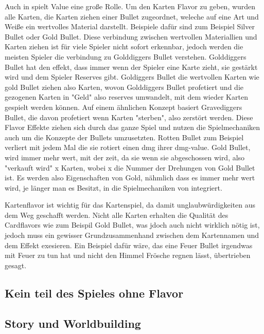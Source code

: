 Auch in \FF spielt Value eine große Rolle.
Um den Karten Flavor zu geben, wurden alle Karten, die Karten ziehen einer Bullet zugeordnet, weleche auf eine Art und Weiße ein wertvolles Material darstellt.
Beispiele dafür sind zum Beispiel Silver Bullet oder Gold Bullet. Diese verbindung zwischen wertvollen
Materiallien und Karten ziehen ist für viele Spieler nicht sofort erkennbar, jedoch werden die meisten Spieler die verbindung zu Golddiggers Bullet verstehen.
Golddiggers Bullet hat den effekt, dass immer wenn der Spieler eine Karte zieht, sie gestärkt wird und dem Spieler Reserves gibt.
Goldiggers Bullet die wertvollen Karten wie gold Bullet ziehen also Karten, wovon Golddiggers Bullet profetiert und die
gezogenen Karten in "Geld" also reserves umwandelt, mit dem wieder Karten gespielt werden können. Auf einem ähnlichen Konzept basiert Gravediggers Bullet, die davon profetiert wenn Karten "sterben", also zerstört werden.
Diese Flavor Effekte ziehen sich durch das ganze Spiel und nutzen die Spielmechaniken auch um die Konzepte der Bullets umzusetzten.
Rotten Bullet zum Beispiel verliert mit jedem Mal die sie rotiert einen dmg ihrer dmg-value. Gold Bullet, wird immer mehr
wert, mit der zeit, da sie wenn sie abgeschossen wird, also "verkauft wird" x Karten, wobei x die Nummer der Drehungen
von Gold Bullet ist. Es werden also Eigenschaften von Gold, nähmlich dass es immer mehr wert wird, je länger man es Besitzt,
in die Spielmechaniken von \FF integriert.


Kartenflavor ist wichtig für das Kartenspiel, da damit unglaubwürdigkeiten aus dem Weg geschafft werden.
Nicht alle Karten erhalten die Qualität des Cardflavors wie zum Beispil Gold Bullet, was jdoch auch nicht wirklich nötig ist, jedoch muss ein gewisser Grundzusammenhand zwischen dem Kartennamen und dem Effekt exesieren.
Ein Beispiel dafür wäre, das eine Feuer Bullet irgendwas mit Feuer zu tun hat und nicht den Himmel Frösche regnen lässt,
übertrieben gesagt.








\subsection{Kein teil des Spieles ohne Flavor}\label{subsec:flavour-durch-mechaniken}





\subsection{Story und Worldbuilding}\label{subsec:flavour-durch-mechaniken}


\renewcommand{\kapitelautor}{}
